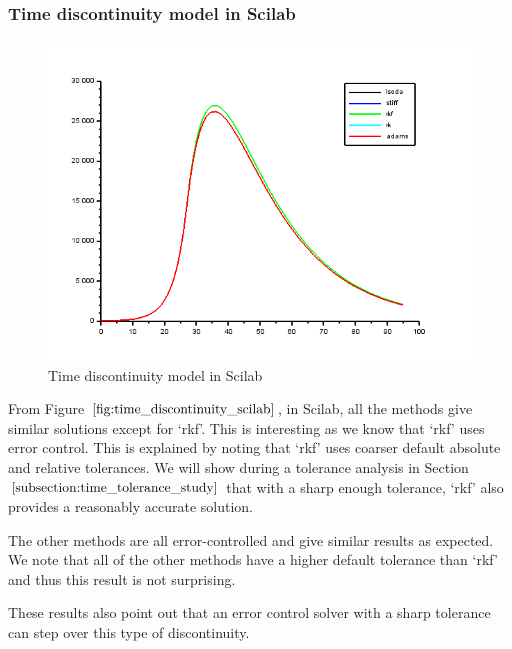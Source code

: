 \subsubsection{Time discontinuity model in Scilab}
\begin{figure}[h]
\centering
\includegraphics[width=0.7\linewidth]{./figures/time_discontinuity_scilab}
\caption{Time discontinuity model in Scilab}
\label{fig:time_discontinuity_scilab}
\end{figure}
From Figure $\ref{fig:time_discontinuity_scilab}$, in Scilab, all the methods give similar solutions except for `rkf'. This is interesting as we know that `rkf' uses error control. This is explained by noting that `rkf' uses coarser default absolute and relative tolerances. We will show during a tolerance analysis in Section $\ref{subsection:time_tolerance_study}$ that with a sharp enough tolerance, `rkf' also provides a reasonably accurate solution.

The other methods are all error-controlled and give similar results as expected. We note that all of the other methods have a higher default tolerance than `rkf' and thus this result is not surprising.

These results also point out that an error control solver with a sharp tolerance can step over this type of discontinuity.

